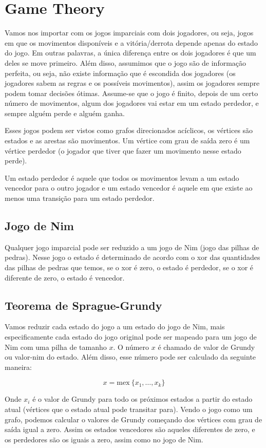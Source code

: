     \section{Game Theory}
        Vamos nos importar com os jogos imparciais com dois jogadores, ou seja, jogos em que os movimentos disponíveis e a vitória/derrota depende apenas do estado do jogo. Em outras palavras, a única diferença entre os dois jogadores é que um deles se move primeiro. Além disso, assumimos que o jogo são de informação perfeita, ou seja, não existe informação que é escondida dos jogadores (os jogadores sabem as regras e os possíveis movimentos), assim os jogadores sempre podem tomar decisões ótimas. Assume-se que o jogo é finito, depois de um certo número de movimentos, algum dos jogadores vai estar em um estado perdedor, e sempre alguém perde e alguém ganha. 
        
        Esses jogos podem ser vistos como grafos direcionados acíclicos, os vértices são estados e as arestas são movimentos. Um vértice com grau de saída zero é um vértice perdedor (o jogador que tiver que fazer um movimento nesse estado perde).

        Um estado perdedor é aquele que todos os movimentos levam a um estado vencedor para o outro jogador e um estado vencedor é aquele em que existe ao menos uma transição para um estado perdedor.

        \subsection{Jogo de Nim}
        Qualquer jogo imparcial pode ser reduzido a um jogo de Nim (jogo das pilhas de pedras). Nesse jogo o estado é determinado de acordo com o xor das quantidades das pilhas de pedras que temos, se o xor é zero, o estado é perdedor, se o xor é diferente de zero, o estado é vencedor.
        \subsection{Teorema de Sprague-Grundy}
        Vamos reduzir cada estado do jogo a um estado do jogo de Nim, mais especificamente cada estado do jogo original pode ser mapeado para um jogo de Nim com uma pilha de tamanho $x$. O número $x$ é chamado de valor de Grundy ou valor-nim do estado. Além disso, esse número pode ser calculado da seguinte maneira:

        \[
        x = \text{mex} \ \{x_1, \dots, x_k \}
        \]

        Onde $x_i$ é o valor de Grundy para todo os próximos estados a partir do estado atual (vértices que o estado atual pode transitar para). Vendo o jogo como um grafo, podemos calcular o valores de Grundy começando dos vértices com grau de saída igual a zero. Assim os estados vencedores são aqueles diferentes de zero, e os perdedores são os iguais a zero, assim como no jogo de Nim.

